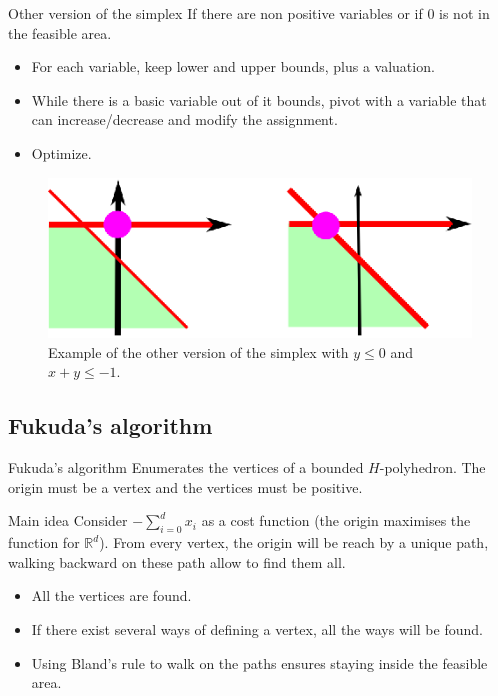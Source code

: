 \begin{frame}{Other version of the simplex}
If there are non positive variables or if $0$ is not in the feasible area.
\begin{itemize}
\item For each variable, keep lower and upper bounds, plus a valuation.
\item While there is a basic variable out of it bounds, pivot with a variable that can increase/decrease and modify the assignment.
\item Optimize.
\end{itemize}

\begin{figure}
\includegraphics[scale=1]{images/simplex2.eps}
\caption{Example of the other version of the simplex with $y\leq 0$ and $x+y\leq -1$.}
\end{figure}
\end{frame}

\subsection{Fukuda's algorithm}

\begin{frame}{Fukuda's algorithm}
Enumerates the vertices of a bounded $H$-polyhedron. The origin must be a vertex and the vertices must be positive. 
\begin{block}{Main idea}
Consider $-\sum_{i=0}^d x_i$ as a cost function (the origin maximises the function for $\mathbb{R}^d$). From every vertex, the origin will be reach by a unique path, walking backward on these path allow to find them all.
\end{block}

\begin{itemize}
\item All the vertices are found.
\item If there exist several ways of defining a vertex, all the ways will be found. 
\item Using Bland's rule to walk on the paths ensures staying inside the feasible area.
\end{itemize}


\end{frame}

